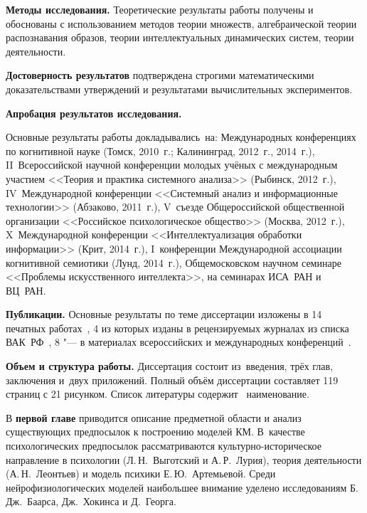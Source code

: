 \textbf{Методы исследования.} Теоретические результаты работы получены и обоснованы с использованием методов теории множеств, алгебраической теории распознавания образов, теории интеллектуальных динамических систем, теории деятельности.

\textbf{Достоверность результатов} подтверждена строгими математическими доказательствами утверждений и результатами вычислительных экспериментов.

\textbf{Апробация результатов исследования.}

Основные результаты работы докладывались~на: Международных конференциях по когнитивной науке (Томск, 2010~г.; Калининград, 2012~г., 2014~г.), II~Всероссийской научной конференции молодых учёных с международным участием <<Теория и практика системного анализа>> (Рыбинск, 2012~г.), IV~Международной конференции <<Системный анализ и информационные технологии>> (Абзаково, 2011~г.), V~съезде Общероссийской общественной организации <<Российское психологическое общество>> (Москва, 2012~г.), X~Международной конференции <<Интеллектуализация обработки информации>> (Крит, 2014~г.), I~конференции Международной ассоциации когнитивной семиотики (Лунд, 2014~г.), Общемосковском научном семинаре <<Проблемы искусственного интеллекта>>, на семинарах ИСА~РАН и ВЦ~РАН.

\textbf{Публикации.} Основные результаты по теме диссертации изложены в 14 печатных работах~\cite{PanovA2011,PanovA2012a,PanovA2012b,PanovA2012c,PanovA2013b,PanovA2014a,PanovT2010b,PanovT2012a,PanovT2012b,PanovT2013,PanovT2014a,PanovT2014b,PanovA2014c,PanovT2014c}, 4 из которых изданы в рецензируемых журналах из списка ВАК~РФ~\cite{PanovA2012c,PanovA2013b,PanovT2013,PanovA2014a}, 8 "--- в материалах всероссийских и международных конференций~\cite{PanovA2011,PanovA2012a,PanovA2012b,PanovT2010b,PanovT2012b,PanovT2014a,PanovT2014b,PanovT2014c}.

\textbf{Объем и структура работы.} Диссертация состоит из~введения, трёх глав, заключения и~двух приложений. Полный объём диссертации составляет 119 страниц с 21 рисунком. Список литературы содержит \totalcitnums\ наименование.

В \textbf{первой главе} приводится описание предметной области и анализ существующих предпосылок к построению моделей КМ. В~качестве психологических предпосылок рассматриваются культурно-историческое направление в психологии (Л.\,Н.~Выготский и А.\,Р.~Лурия), теория деятельности (А.\,Н.~Леонтьев) и модель психики Е.\,Ю.~Артемьевой. Среди нейрофизиологических моделей наибольшее внимание уделено исследованиям Б.\,Дж.~Баарса, Дж.~Хокинса и Д.~Георга.

